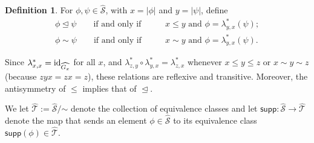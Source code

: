 \documentclass[11pt, oneside, reqno]{amsart}
\theoremstyle{definition}
\newtheorem{definition}[theorem]{Definition}
\numberwithin{equation}{section}
\def \SS{{\mathcal{S}}}
\def \TT{{\mathcal{T}}}
\def \wh{\widehat}
\DeclareMathOperator{\chleq}{\unlhd}
\def\qqiff{\qquad\text{if and only if}\qquad}
\def \supp{\mathsf{supp}}
\newcommand{\abs}[1]{|{#1}|} 				%
\begin{document}
\begin{definition}\label{def:chleq}
    For $\phi,\psi \in \wh{\SS}$, with $x = \abs{\phi}$ and $y = \abs{\psi}$, define
    \begin{align}
        \label{eq:poset-S-hat} \phi \chleq \psi         \qqiff &          x \leq y \text{ and } \phi = \lambda_{y,x}^*(\psi);\\
        \label{eq:equiv-S-hat} \phi \sim \psi         \qqiff &          x \sim y \text{ and } \phi = \lambda_{y,x}^*(\psi).
    \end{align}
\end{definition}
Since $\lambda_{x,x}^* = {\rm id}_{\wh{G_x}}$ for all $x$, and
$\lambda_{z,y}^* \circ \lambda_{y,x}^* = \lambda_{z,x}^*$ whenever $x \leq y \leq z$ or $x \sim y \sim z$ (because $zyx = zx = z$), these relations are reflexive and transitive. Moreover, the antisymmetry of $\leq$ implies that of $\chleq$.

We let $\wh{\TT} := \wh{\SS}/\mathord{\sim}$ denote the collection of equivalence classes and let $\supp : \wh{\SS} \to \wh{\TT}$ denote the map that sends an element $\phi \in \wh{\SS}$ to its equivalence class $\supp(\phi) \in \wh{\TT}$.
\end{document}
